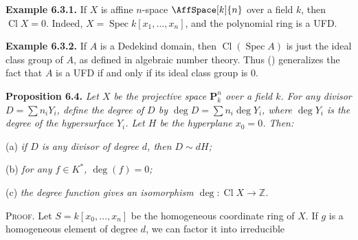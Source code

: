 {\medskip
\noindent\hypertarget{result-II-6.3.1}{}\textbf{Example 6.3.1.} If $X$ is affine $n$-space $\AffSpace[k]{n}$ over a field $k$, then $\operatorname{Cl} X=0$. Indeed, $X=\operatorname{Spec} k[x_1,\ldots,x_n]$, and the polynomial ring is a UFD.

\medskip
\noindent\hypertarget{result-II-6.3.2}{}\textbf{Example 6.3.2.} If $A$ is a Dedekind domain, then $\operatorname{Cl}(\operatorname{Spec} A)$ is just the ideal class group of $A$, as defined in algebraic number theory. Thus () generalizes the fact that $A$ is a UFD if and only if its ideal class group is $0$.

\medskip
\noindent\hypertarget{result-II-6.4}{}\textbf{Proposition 6.4.} \emph{Let $X$ be the projective space $\mathbf P_k^n$ over a field $k$. For any divisor $D=\sum n_iY_i$, define the degree of $D$ by $\deg D=\sum n_i\deg Y_i$, where $\deg Y_i$ is the degree of the hypersurface $Y_i$. Let $H$ be the hyperplane $x_0=0$. Then:}

\noindent\hspace*{1.7em}\hypertarget{result-II-6.4-a}{}(a) \emph{if $D$ is any divisor of degree $d$, then $D\sim dH$;}

\noindent\hspace*{1.7em}\hypertarget{result-II-6.4-b}{}(b) \emph{for any $f\in K^*$, $\deg(f)=0$;}

\noindent\hspace*{1.7em}\hypertarget{result-II-6.4-c}{}(c) \emph{the degree function gives an isomorphism $\deg\colon\operatorname{Cl} X\to\mathbb Z$.}

\smallskip
\noindent\textsc{Proof.} Let $S=k[x_0,\ldots,x_n]$ be the homogeneous coordinate ring of $X$. If $g$ is a homogeneous element of degree $d$, we can factor it into irreducible}
